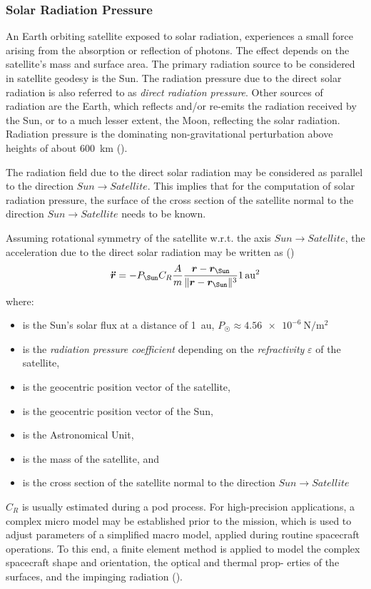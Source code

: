 \subsubsection{Solar Radiation Pressure}\label{sssec:solar-radiation-pressure}

An Earth orbiting satellite exposed to solar radiation, experiences a small force
arising from the absorption or reflection of photons. The effect depends on the
satellite's mass and surface area. The primary radiation source to be considered 
in satellite geodesy is the Sun. The radiation pressure due to the direct solar 
radiation is also referred to as \emph{direct radiation pressure}. Other sources 
of radiation are the Earth, which reﬂects and/or re-emits the radiation received 
by the Sun, or to a much lesser extent, the Moon, reﬂecting the solar radiation. 
Radiation pressure is the dominating non-gravitational perturbation above heights 
of about \SI{600}{\km} (\cite{BeutlerVII}).

The radiation ﬁeld due to the direct solar radiation may be considered as
parallel to the direction \(Sun \to Satellite\). This implies that for the computation 
of solar radiation pressure, the surface of the cross section of the satellite 
normal to the direction \(Sun \to Satellite\) needs to be known.

Assuming rotational symmetry of the satellite w.r.t. the axis \(Sun \to Satellite\), 
the acceleration due to the direct solar radiation may be written as (\cite{BeutlerVII})
\begin{equation}
    \label{eq:mont375}
    \bm{\ddot{r}} = -P_{\Sun} C_R \frac{A}{m} 
    \frac{\bm{r} - \bm{r}_{\Sun}}{\norm{\bm{r} - \bm{r}_{\Sun}}^3}
    \SI{1}{\astronomicalunit}^2
\end{equation}
where:
\begin{itemize}
\item[$P_{\Sun}$] is the Sun's solar flux at a distance of \SI{1}{\astronomicalunit}, 
  $P_{\Sun} \approx \SI{4.56e-6}{\newton\per\meter\tothe{2}}$
\item[\({C_R}\)] is the \emph{radiation pressure coefficient} depending on the 
  \emph{refractivity} $\varepsilon$ of the satellite, 
\item[\(\bm{r}\)] is the geocentric position vector of the satellite,
\item[\(\bm{r_{\Sun}}\)] is the geocentric position vector of the Sun,
\item[\si{\astronomicalunit}] is the Astronomical Unit,
\item[\(m\)] is the mass of the satellite, and
\item[\(A\)] is the cross section of the satellite normal to the direction 
  \(Sun \to Satellite\)
\end{itemize}
$C_R$ is usually estimated during a \gls{pod} process. For high-precision applications, 
a complex micro model may be established prior to the mission, which is used to
adjust parameters of a simplified macro model, applied during routine spacecraft
operations. To this end, a finite element method is applied to
model the complex spacecraft shape and orientation, the optical and thermal prop-
erties of the surfaces, and the impinging radiation (\cite{Montenbruck2000}).

